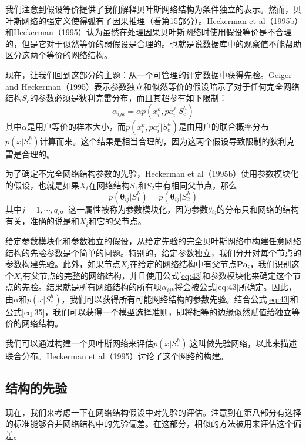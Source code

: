 \documentclass[10pt,a4paper]{article}
\begin{document}
\begin{CJK*}{UTF8}{gkai}
我们注意到假设等价提供了我们解释贝叶斯网络结构为条件独立的表示。然而，贝叶斯网络的强定义使得弧有了因果推理（看第15部分）。Heckerman et al（1995b）和Heckerman（1995）认为虽然在处理因果贝叶斯网络时使用假设等价是不合理的，但是它对于似然等价的弱假设是合理的。也就是说数据库中的观察值不能帮助区分这两个等价的网络结构。



现在，让我们回到这部分的主题：从一个可管理的评定数据中获得先验。Geiger and Heckerman（1995）表示参数独立和似然等价的假设暗示了对于任何完全网络结构$S_c$的参数必须是狄利克雷分布，而且其超参有如下限制：
\begin{equation}
\alpha_{ijk}=\alpha p(x_i^k,pa_i^j|S_c^h)
\end{equation}
其中$\alpha$是用户等价的样本大小，而$p(x_i^k,pa_i^j|S_c^h)$是由用户的联合概率分布$p(x|S_c^h)$计算而来。这个结果是相当合理的，因为这两个假设导致限制的狄利克雷是合理的。


为了确定不完全网络结构参数的先验，Heckerman et al（1995b）使用参数模块化的假设，也就是如果$X_i$在网络结构$S_1$和$S_2$中有相同父节点，那么
\begin{equation}
p(\boldsymbol{\theta}_{ij}|S_1^h)=p(\boldsymbol{\theta}_{ij}|S_2^h)
\end{equation}
其中$j=1,\cdots,q_i$。这一属性被称为参数模块化，因为参数$\theta_{ij}$的分布只和网络的结构有关，准确的说是和$X_i$和它的父节点。



给定参数模块化和参数独立的假设，从给定先验的完全贝叶斯网络中构建任意网络结构的先验参数是个简单的问题。特别的，给定参数独立，我们分开对每个节点的参数构建先验。此外，如果节点$X_i$在给定的网络结构中有父节点$\boldsymbol{Pa}_i$，我们识别这个$X_i$有父节点的完整的网络结构，并且使用公式\ref{eq:43}和参数模块化来确定这个节点的先验。结果就是所有网络结构的所有项$\alpha_{ijk}$将会被公式\ref{eq:43}所确定。因此，由$\alpha$和$p(x|S_c^h)$，我们可以获得所有可能网络结构的参数先验。结合公式\ref{eq:43}和公式\ref{eq:35}，我们可以获得一个模型选择准则，即将相等的边缘似然赋值给独立等价的网络结构。


我们可以通过构建一个贝叶斯网络来评估$p(x|S_c^h)$,这叫做先验网络，以此来描述联合分布。Heckerman et al（1995）讨论了这个网络的构建。


\subsection{结构的先验}
现在，我们来考虑一下在网络结构假设中对先验的评估。注意到在第八部分有选择的标准能够合并网络结构中的先验偏差。在这部分，相似的方法被用来评估这个偏差。



\end{CJK*}
\end{document}
